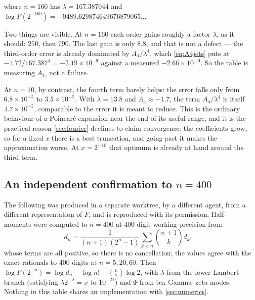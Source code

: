 \documentclass[11pt,oneside]{article}
\theoremstyle{definition}
\theoremstyle{remark}
\begin{document}
where $n=160$ has $\lambda=167.387044$ and
$\log F(2^{-160})=-9489.629874649676879065\dots$

Two things are visible.  At $n=160$ each order gains roughly a factor
$\lambda$, as it should: $250$, then $790$.  The last gain is only $8.8$,
and that is not a defect --- the third-order error is already dominated by
$A_4/\lambda^4$, which \cref{eq:A4jets} puts at
$-1.72/167.387^4=-2.19\times10^{-9}$ against a measured
$-2.66\times10^{-9}$.  So the table is measuring $A_4$, not a failure.

At $n=10$, by contrast, the fourth term barely helps: the error falls only
from $6.8\times10^{-5}$ to $3.5\times10^{-5}$.  With $\lambda=13.8$ and
$A_4\approx-1.7$, the term $A_4/\lambda^4$ is itself $4.7\times10^{-5}$,
comparable to the error it is meant to reduce.  This is the ordinary
behaviour of a Poincar\'e expansion near the end of its useful range, and it
is the practical reason \cref{sec:fourier} declines to claim convergence:
the coefficients grow, so for a fixed $x$ there is a best truncation, and
going past it makes the approximation worse.  At $x=2^{-10}$ that optimum is
already at hand around the third term.

\subsection{An independent confirmation to $n=400$}

The following was produced in a separate worktree, by a different agent,
from a different representation of $F$, and is reproduced with its
permission.  Half-moments were computed to $n=400$ at $400$-digit working
precision from
\[
  d_n=\frac1{(n+1)(2^n-1)}\sum_{k<n}\binom{n+1}{k}d_k,
\]
whose terms are all positive, so there is no cancellation; the values agree
with the exact rationals to $400$ digits at $n=5,20,60$.  Then
$\log F(2^{-n})=\log d_n-\log n!-\binom n2\log2$, with $\lambda$ from the
lower Lambert branch (satisfying $\lambda2^{-\lambda}=x$ to $10^{-21}$) and
$\Psi$ from ten Gamma--zeta modes.  Nothing in this table shares an
implementation with \cref{sec:numerics}.
\end{document}
